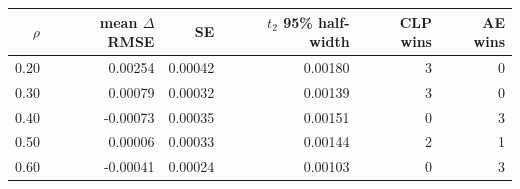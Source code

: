 \begin{tabular}{rrrrrr}
\toprule
$\rho$ & mean $\Delta$RMSE & SE & $t_{2}$ 95\% half-width & CLP wins & AE wins \\
\midrule
0.20 & 0.00254 & 0.00042 & 0.00180 & 3 & 0 \\
0.30 & 0.00079 & 0.00032 & 0.00139 & 3 & 0 \\
0.40 & -0.00073 & 0.00035 & 0.00151 & 0 & 3 \\
0.50 & 0.00006 & 0.00033 & 0.00144 & 2 & 1 \\
0.60 & -0.00041 & 0.00024 & 0.00103 & 0 & 3 \\
\bottomrule
\end{tabular}
